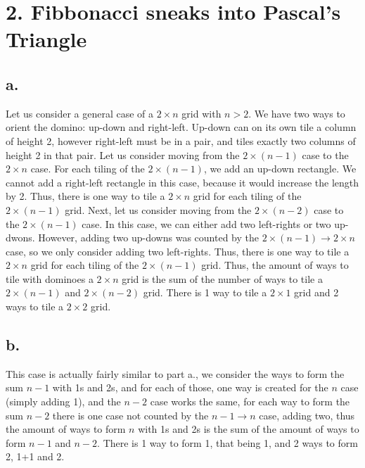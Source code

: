 \documentclass{article}
\begin{document}
\pagebreak
\section*{2. Fibbonacci sneaks into Pascal's Triangle}
\subsection*{a. } Let us consider a general case of a $2 \times n$ grid with $n>2$. We have two ways to orient the domino: up-down and right-left. Up-down can on its own tile a column of height 2, however right-left must be in a pair, and tiles exactly two columns of height 2 in that pair. Let us consider moving from the $2\times(n-1)$ case to the $2\times n$ case. For each tiling of the $2\times(n-1)$, we add an up-down rectangle. We cannot add a right-left rectangle in this case, because it would increase the length by 2. Thus, there is one way to tile a $2\times n$ grid for each tiling of the $2\times(n-1)$ grid. Next, let us consider moving from the $2\times (n-2)$ case to the $2\times (n-1)$ case. In this case, we can either add two left-rights or two up-dwons. However, adding two up-downs was counted by the $2\times (n-1) \to 2\times n$ case, so we only consider adding two left-rights. Thus, there is one way to tile a $2\times n$ grid for each tiling of the $2\times (n-1)$ grid. Thus, the amount of ways to tile with dominoes a $2\times n$ grid is the sum of the number of ways to tile a $2\times (n-1)$ and $2\times (n-2)$ grid. There is 1 way to tile a $2\times 1$ grid and 2 ways to tile a $2\times 2$ grid.
\subsection*{b.}
This case is actually fairly similar to part a., we consider the ways to form the sum $n-1$ with 1s and 2s, and for each of those, one way is created for the $n$ case (simply adding 1), and the $n-2$ case works the same, for each way to form the sum $n-2$ there is one case not counted by the $n-1 \to n$ case, adding two, thus the amount of ways to form $n$ with 1s and 2s is the sum of the amount of ways to form $n-1$ and $n-2$. There is 1 way to form 1, that being 1, and 2 ways to form 2, 1+1 and 2. 
\end{document}
